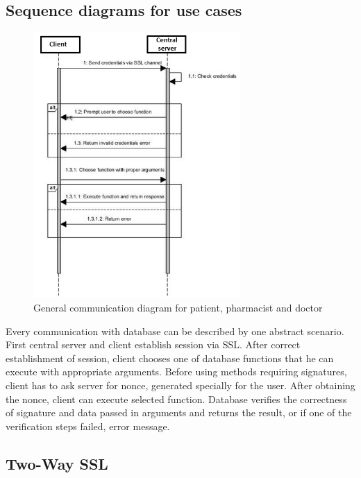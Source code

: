 \subsection{Sequence diagrams for use cases}
\begin{figure}[h]
\centering
\includegraphics[width=0.7\textwidth]{database/sequence.png}
\caption{General communication diagram for patient, pharmacist and doctor}
\end{figure} 
Every communication with database can be described by one abstract scenario.
First central server and client establish session via SSL. After correct establishment of session, client chooses one of database functions that he can execute with appropriate arguments. Before using methods requiring signatures, client has to ask server for nonce, generated specially for the user. After obtaining the nonce, client can execute selected function.
Database verifies the correctness of signature and data passed in arguments and returns the result, or if one of the verification steps failed, error message.


\subsection{Two-Way SSL}

